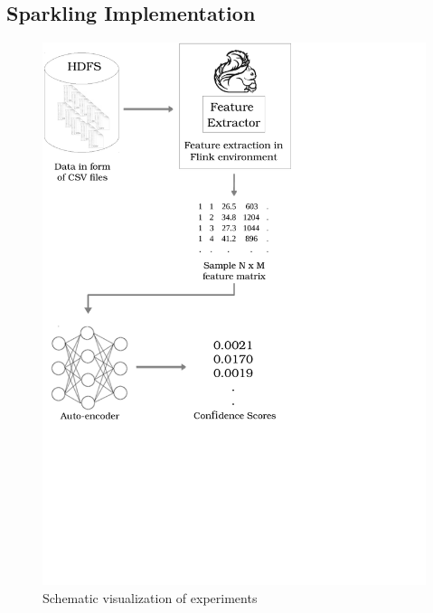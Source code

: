 \documentclass{vldb}
\begin{document}
\subsection{Sparkling Implementation}
\label{subsec:sparkling-impl}

\begin{figure}
\centering
\includegraphics[trim=0cm 9cm 7.4cm 0cm, clip=true, width=0.8\linewidth]{"pics/approach2"}
\caption{Schematic visualization of experiments}
\label{fig:approach-2}
\end{figure}
\end{document}
